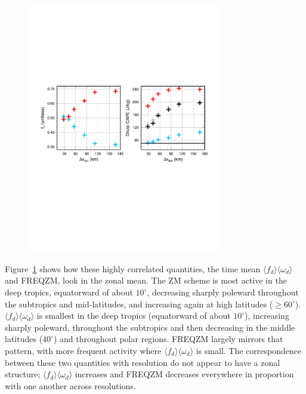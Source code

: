 \begin{figure}[t]
\begin{center}
\noindent\includegraphics[width=20pc,angle=0]{chapter6/temp_cape.pdf}\\
\end{center}
\caption{}
\label{fig:vomg}
\end{figure}

Figure~\ref{fig:vomg} shows how these highly correlated quantities, the time mean $\langle f_{d} \rangle \langle \omega_{d} \rangle$ and FREQZM, look in the zonal mean. The ZM scheme is most active in the deep tropics, equatorward of about $10^{\circ}$, decreasing sharply poleward throughout the subtropics and mid-latitudes, and increasing again at high latitudes ($\geq 60^{\circ}$). $\langle f_{d} \rangle \langle \omega_{d} \rangle$ is smallest in the deep tropics (equatorward of about $10^{\circ}$), increasing sharply poleward, throughout the subtropics and then decreasing in the middle latitudes ($40^{\circ}$) and throughout polar regions. FREQZM largely mirrors that pattern, with more frequent activity where $\langle f_{d} \rangle \langle \omega_{d} \rangle$ is small. The correspondence between these two quantities with resolution do not appear to have a zonal structure; $\langle f_{d} \rangle \langle \omega_{d} \rangle$  increases and FREQZM decreases everywhere in proportion with one another across resolutions.

